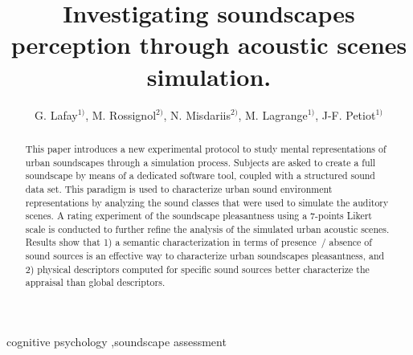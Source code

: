 \documentclass[preprint,12pt]{elsarticle}
\begin{document}
\begin{frontmatter}


    \author{G. Lafay$^{1)}$, M. Rossignol$^{2)}$, N. Misdariis$^{2)}$, M. Lagrange$^{1)}$, J-F. Petiot$^{1)}$}

    \address{$^{1)}$ Laboratoire des Sciences du Numérique, Nantes, France.\\
    \hspace*{8pt}mathieu.lagrange@cnrs.fr\\
    $^{2)}$ STMS Ircam-CNRS-UPMC Institut de Recherche et Coordination Acoustique/Musique, Paris, France}


    \title{Investigating soundscapes perception through acoustic scenes simulation.}

  \begin{abstract}
    This paper introduces a new experimental protocol to study mental representations of urban soundscapes through a simulation process. Subjects are asked to create a full soundscape by means of a dedicated software tool, coupled with a structured sound data set. This paradigm is used to characterize urban sound environment representations by analyzing the sound classes that were used to simulate the auditory scenes. A rating experiment of the soundscape pleasantness using a 7-points Likert scale is conducted to further refine the analysis of the simulated urban acoustic scenes. Results show that 1) a semantic characterization in terms of presence~/ absence of sound sources is an effective way to characterize urban soundscapes pleasantness, and 2) physical descriptors computed for specific sound sources better characterize the appraisal than global descriptors.
  \end{abstract}

  \begin{keyword}
 cognitive psychology \sep soundscape assessment


  \end{keyword}

\end{frontmatter}


\end{document}
